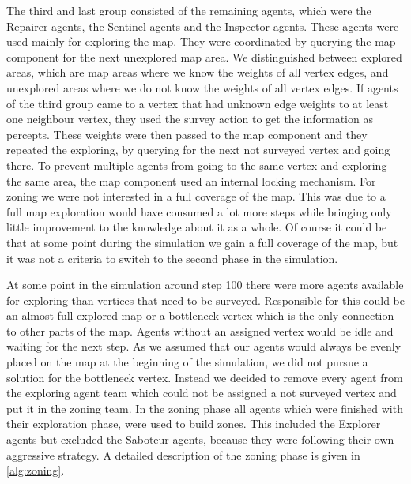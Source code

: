The third and last group consisted of the remaining agents, which were the Repairer agents, the Sentinel agents and the Inspector agents.
These agents were used mainly for exploring the map.
They were coordinated by querying the map component for the next unexplored map area. We distinguished between explored areas, which are map areas where we know the weights of all vertex edges, and unexplored areas where we do not know the weights of all vertex edges.
If agents of the third group came to a vertex that had unknown edge weights to at least one neighbour vertex, they used the survey action to get the information as percepts.
These weights were then passed to the map component and they repeated the exploring, by querying for the next not surveyed vertex and going there.
To prevent multiple agents from going to the same vertex and exploring the same area, the map component used an internal locking mechanism.
For zoning we were not interested in a full coverage of the map. This was due to a full map exploration would have consumed a lot more steps while bringing only little improvement to the knowledge about it as a whole. Of course it could be that at some point during the simulation we gain a full coverage of the map, but it was not a criteria to switch to the second phase in the simulation.

At some point in the simulation around step 100 there were more agents available for exploring than vertices that need to be surveyed. Responsible for this could be an almost full explored map or a bottleneck vertex which is the only connection to other parts of the map. Agents without an assigned vertex would be idle and waiting for the next step. As we assumed that our agents would always be evenly placed on the map at the beginning of the simulation, we did not pursue a solution for the bottleneck vertex. Instead we decided to remove every agent from the exploring agent team which could not be assigned a not surveyed vertex and put it in the zoning team. In the zoning phase all agents which were finished with their exploration phase, were used to build zones. This included the Explorer agents but excluded the Saboteur agents, because they were following their own aggressive strategy.
A detailed description of the zoning phase is given in \autoref{alg:zoning}.
